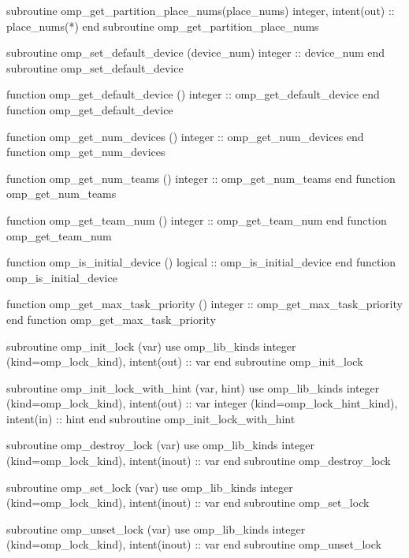 {\begin{codepar}
          subroutine omp\_get\_partition\_place\_nums(place\_nums)
          integer, intent(out) :: place\_nums(*)
          end subroutine omp\_get\_partition\_place\_nums

          subroutine omp\_set\_default\_device (device\_num)
           integer :: device\_num
          end subroutine omp\_set\_default\_device

          function omp\_get\_default\_device ()
           integer :: omp\_get\_default\_device
          end function omp\_get\_default\_device

          function omp\_get\_num\_devices ()
           integer :: omp\_get\_num\_devices
          end function omp\_get\_num\_devices

          function omp\_get\_num\_teams ()
           integer :: omp\_get\_num\_teams
          end function omp\_get\_num\_teams

          function omp\_get\_team\_num ()
           integer :: omp\_get\_team\_num
          end function omp\_get\_team\_num

          function omp\_is\_initial\_device ()
           logical :: omp\_is\_initial\_device
          end function omp\_is\_initial\_device

          function omp\_get\_max\_task\_priority ()
           integer :: omp\_get\_max\_task\_priority
          end function omp\_get\_max\_task\_priority

          subroutine omp\_init\_lock (var)
           use omp\_lib\_kinds
           integer (kind=omp\_lock\_kind), intent(out) :: var
          end subroutine omp\_init\_lock

          subroutine omp\_init\_lock\_with\_hint (var, hint)
           use omp\_lib\_kinds
           integer (kind=omp\_lock\_kind), intent(out) :: var
           integer (kind=omp\_lock\_hint\_kind), intent(in) :: hint
          end subroutine omp\_init\_lock\_with\_hint

          subroutine omp\_destroy\_lock (var)
           use omp\_lib\_kinds
           integer (kind=omp\_lock\_kind), intent(inout) :: var
          end subroutine omp\_destroy\_lock

          subroutine omp\_set\_lock (var)
           use omp\_lib\_kinds
           integer (kind=omp\_lock\_kind), intent(inout) :: var
          end subroutine omp\_set\_lock

          subroutine omp\_unset\_lock (var)
           use omp\_lib\_kinds
           integer (kind=omp\_lock\_kind), intent(inout) :: var
          end subroutine omp\_unset\_lock


\end{codepar}}
